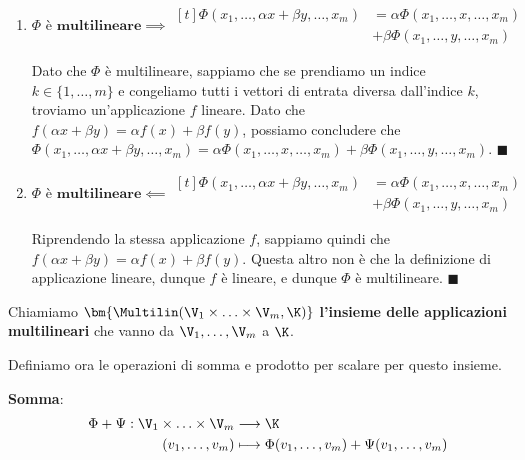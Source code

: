 \documentclass[11pt, a4paper, titlepage, oneside]{scrbook}
\begin{document}
\begin{enumerate}[label=\arabic*°]
    \item \leavevmode
    $\Phi \textbf{ è multilineare} \implies
    \begin{aligned}[t]
    \Phi(x_1, \ldots, \alpha x + \beta y, \ldots, x_m) &= \alpha \Phi(x_1, \ldots, x, \ldots, x_m) \\
    &+ \beta \Phi(x_1, \ldots, y, \ldots, x_m)
    \end{aligned}$
    \vspace{0.2cm}

    Dato che $\Phi$ è multilineare, sappiamo che se prendiamo un indice $k \in \{1, \ldots, m\}$ e congeliamo tutti i vettori di entrata diversa dall'indice $k$, troviamo un'applicazione $f$ lineare. Dato che $f(\alpha x + \beta y) = \alpha f(x) + \beta f(y)$, possiamo concludere che
    \mbox{$\Phi(x_1, \ldots, \alpha x + \beta y, \ldots, x_m) = \alpha \Phi(x_1, \ldots, x, \ldots, x_m) + \beta \Phi(x_1, \ldots, y, \ldots, x_m)$}. $\blacksquare$

    \item \leavevmode
    $\Phi \textbf{ è multilineare} \impliedby
    \begin{aligned}[t]
    \Phi(x_1, \ldots, \alpha x + \beta y, \ldots, x_m) &= \alpha \Phi(x_1, \ldots, x, \ldots, x_m) \\
    &+ \beta \Phi(x_1, \ldots, y, \ldots, x_m)
    \end{aligned}$
    \vspace{0.2cm}

    Riprendendo la stessa applicazione $f$, sappiamo quindi che $f(\alpha x + \beta y) = \alpha f(x) + \beta f(y)$. Questa altro non è che la definizione di applicazione lineare, dunque $f$ è lineare, e dunque $\Phi$ è multilineare. $\blacksquare$
\end{enumerate}

\begin{Definizione}
\label{def-insieme-app-multilineari}
Chiamiamo $\bm{\Multilin (\V_1 \times \ldots \times \V_m, \K)}$ \textbf{l'insieme delle applicazioni multilineari} che vanno da $\V_1, \ldots, \V_m$ a $\K$.
\end{Definizione}

Definiamo ora le operazioni di somma e prodotto per scalare per questo insieme.

\bigskip

    {\Large\textbf{Somma}:}
    \begin{align*}
        \hspace{0.4cm}\Phi + \Psi: \V_1 \times \ldots \times \V_m &\longrightarrow \K \\
        \hspace{0.4cm}(v_1,\ldots,v_m) &\longmapsto \Phi(v_1, \ldots, v_m) + \Psi(v_1, \ldots, v_m)
    \end{align*}
\end{document}
